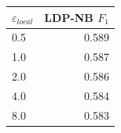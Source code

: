 \begin{tabular}{lr}
\toprule
$\varepsilon_{local}$ & LDP-NB $F_1$ \\
\midrule
0.5 & 0.589 \\
1.0 & 0.587 \\
2.0 & 0.586 \\
4.0 & 0.584 \\
8.0 & 0.583 \\
\bottomrule
\end{tabular}
